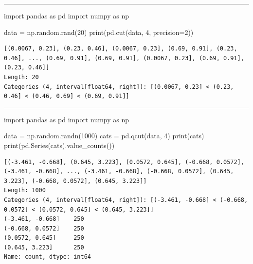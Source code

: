 \documentclass[
  polish,
  letterpaper,
  DIV=11,
  numbers=noendperiod]{scrreprt}
\newenvironment{Shaded}{\begin{snugshade}}{\end{snugshade}}
\newcommand{\BuiltInTok}[1]{\textcolor[rgb]{0.00,0.23,0.31}{#1}}
\newcommand{\DecValTok}[1]{\textcolor[rgb]{0.68,0.00,0.00}{#1}}
\newcommand{\ImportTok}[1]{\textcolor[rgb]{0.00,0.46,0.62}{#1}}
\newcommand{\NormalTok}[1]{\textcolor[rgb]{0.00,0.23,0.31}{#1}}
\newcommand{\OperatorTok}[1]{\textcolor[rgb]{0.37,0.37,0.37}{#1}}
\begin{document}
\begin{center}\rule{0.5\linewidth}{0.5pt}\end{center}

\begin{Shaded}
\begin{Highlighting}[]
\ImportTok{import}\NormalTok{ pandas }\ImportTok{as}\NormalTok{ pd}
\ImportTok{import}\NormalTok{ numpy }\ImportTok{as}\NormalTok{ np}

\NormalTok{data }\OperatorTok{=}\NormalTok{ np.random.rand(}\DecValTok{20}\NormalTok{)}
\BuiltInTok{print}\NormalTok{(pd.cut(data, }\DecValTok{4}\NormalTok{, precision}\OperatorTok{=}\DecValTok{2}\NormalTok{))}
\end{Highlighting}
\end{Shaded}

\begin{verbatim}
[(0.0067, 0.23], (0.23, 0.46], (0.0067, 0.23], (0.69, 0.91], (0.23, 0.46], ..., (0.69, 0.91], (0.69, 0.91], (0.0067, 0.23], (0.69, 0.91], (0.23, 0.46]]
Length: 20
Categories (4, interval[float64, right]): [(0.0067, 0.23] < (0.23, 0.46] < (0.46, 0.69] < (0.69, 0.91]]
\end{verbatim}

\begin{center}\rule{0.5\linewidth}{0.5pt}\end{center}

\begin{Shaded}
\begin{Highlighting}[]
\ImportTok{import}\NormalTok{ pandas }\ImportTok{as}\NormalTok{ pd}
\ImportTok{import}\NormalTok{ numpy }\ImportTok{as}\NormalTok{ np}

\NormalTok{data }\OperatorTok{=}\NormalTok{ np.random.randn(}\DecValTok{1000}\NormalTok{)}
\NormalTok{cats }\OperatorTok{=}\NormalTok{ pd.qcut(data, }\DecValTok{4}\NormalTok{)}
\BuiltInTok{print}\NormalTok{(cats)}
\BuiltInTok{print}\NormalTok{(pd.Series(cats).value\_counts())}
\end{Highlighting}
\end{Shaded}

\begin{verbatim}
[(-3.461, -0.668], (0.645, 3.223], (0.0572, 0.645], (-0.668, 0.0572], (-3.461, -0.668], ..., (-3.461, -0.668], (-0.668, 0.0572], (0.645, 3.223], (-0.668, 0.0572], (0.645, 3.223]]
Length: 1000
Categories (4, interval[float64, right]): [(-3.461, -0.668] < (-0.668, 0.0572] < (0.0572, 0.645] < (0.645, 3.223]]
(-3.461, -0.668]    250
(-0.668, 0.0572]    250
(0.0572, 0.645]     250
(0.645, 3.223]      250
Name: count, dtype: int64
\end{verbatim}
\end{document}
